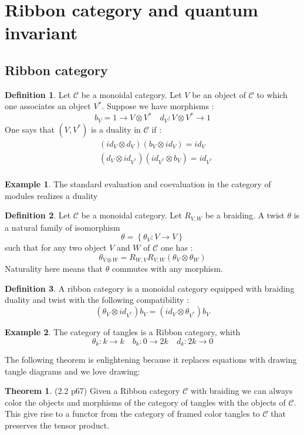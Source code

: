 \documentclass{article}
\theoremstyle{definition}
\newtheorem{theo}{Theorem}[section]
\newtheorem{ex}{Example}[section]
\newtheorem{Def}{Definition}[section]
\begin{document}
\section{Ribbon category and quantum invariant}
\subsection{Ribbon category}
\begin{Def} Let $\mathcal{C}$ be a monoidal category. Let $V$ be an object of $\mathcal{C}$ to which one associates an object $V^{*}$. Suppose we have morphisms : $$b_V= 1\to V\otimes V^{*}\quad d_V : V\otimes V^{*}\to 1 $$ One says that $(V,V^{*})$ is a duality in $\mathcal{C}$ if :
\begin{align*}
&(id_V\otimes d_V)(b_V\otimes id_V)=id_V\\
&(d_V\otimes id_{V^{*}})(id_{V^{*}}\otimes b_V)=id_{V^{*}}\\
\end{align*}
\begin{ex} The standard evaluation and coevaluation in the category of modules realizes a duality
\end{ex}
\end{Def}
\begin{Def} Let $\mathcal{C}$ be a monoidal category. Let $R_{V,W}$ be a braiding. A twist $\theta$ is a natural family of isomorphism $$\theta=\left\lbrace\theta_V : V\to V \right\rbrace $$ such that for any two object $V$ and $W$ of $\mathcal{C}$ one has :
$$\theta_{V\otimes W}=R_{W,V}R_{V,W}(\theta_V\otimes\theta_W)$$ Naturality here means that $\theta$ commutes with any morphism.
\end{Def}
\begin{Def}
A ribbon category is a monoidal category equipped with braiding duality and twist with the following compatibility : 
$$(\theta_V\otimes id_{V^{*}})b_V=(id_V\otimes\theta_{V^{*}})b_V$$
\end{Def}

\begin{ex} The category of tangles is a Ribbon category, whith $$\theta_k : k\to k\quad b_k : 0\to 2k\quad d_k : 2k\to 0 $$ \vspace{10cm}
\end{ex}
The following theorem is enlightening because it replaces equations with drawing tangle diagrams and we love drawing:
\begin{theo}\cite{KasRossTurross} (2.2 p67) Given a Ribbon category $\mathcal{C}$ with braiding we can always color the objects and morphisms of the category of tangles with the objects of  $\mathcal{C}$. This give rise to a functor from the category of framed color tangles to $\mathcal{C}$ that preserves the tensor product.
\end{theo}\vspace{10cm}
\end{document}
